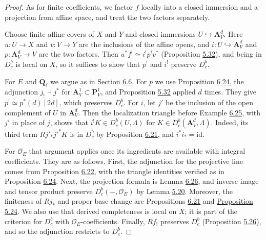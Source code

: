 \documentclass[11pt]{article}
\providecommand{\Dbc}{}\renewcommand{\Dbc}{D^b_c}
\begin{document}
\begin{proof}[{Proof}]\label{bp597}%
As for finite coefficients, we factor \(f\) locally into a closed immersion and a projection from affine space, and treat the two factors separately.

Choose finite affine covers of \(X\) and \(Y\) and closed immersions \(U\hookrightarrow\mathbf A^d_V\). Here \(u:U\to X\) and \(v:V\to Y\) are the inclusions of the affine opens, and \(i:U\hookrightarrow\mathbf A^d_V\) and \(p:\mathbf A^d_V\to V\) are the two factors. Then \(u^*f^!\simeq i^!p^!v^*\) (Proposition \hyperref[bp510]{5.32}), and being in \(\Dbc\) is local on \(X\), so it suffices to show that \(p^!\) and \(i^!\) preserve \(\Dbc\).

For \(E\) and \(\overline{\mathbf Q}_\ell\) we argue as in Section \hyperref[bp568]{6.6}. For \(p\) we use Proposition \hyperref[bp587]{6.24}, the adjunction \(j_!\dashv j^*\) for \(\mathbf A^1_V\subset\mathbf P^1_V\), and Proposition \hyperref[bp510]{5.32} applied \(d\) times. They give \(p^!\simeq p^*(d)[2d]\), which preserves \(\Dbc\). For \(i\), let \(j'\) be the inclusion of the open complement of \(U\) in \(\mathbf A^d_V\). Then the localization triangle before Example \hyperref[bp591]{6.25}, with \(j'\) in place of \(j\), shows that \(i^!K\in\Dbc(U,\Lambda)\) for \(K\in\Dbc(\mathbf A^d_V,\Lambda)\). Indeed, its third term \(Rj'_*j'^*K\) is in \(\Dbc\) by Proposition \hyperref[bp577]{6.21}, and \(i^*i_*=\mathrm{id}\).

For \(\mathcal O_E\) that argument applies once its ingredients are available with integral coefficients. They are as follows. First, the adjunction for the projective line comes from Proposition \hyperref[bp581]{6.22}, with the triangle identities verified as in Proposition \hyperref[bp587]{6.24}. Next, the projection formula is Lemma \hyperref[bp593]{6.26}, and inverse image and tensor product preserve \(\Dbc(-,\mathcal O_E)\) by Lemma \hyperref[bp474]{5.20}. Moreover, the finiteness of \(Rj_*\) and proper base change are Propositions \hyperref[bp577]{6.21} and \hyperref[bp488]{Proposition 5.24}. We also use that derived completeness is local on \(X\); it is part of the criterion for \(\Dbc\) with \(\mathcal O_E\)-coefficients. Finally, \(Rf_!\) preserves \(\Dbc\) (Proposition \hyperref[bp492]{5.26}), and so the adjunction restricts to \(\Dbc\).
\end{proof}



\end{document}
